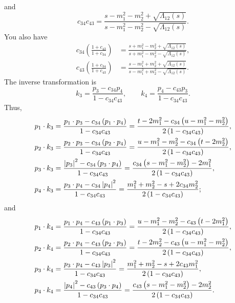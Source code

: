 and
\begin{equation}
	c_{34}c_{43} = \frac{s - m_{1}^{2} - m_{2}^{2} + \sqrt{\Lambda_{12}(s)}}{s - m_{1}^{2} - m_{2}^{2} - \sqrt{\Lambda_{12}(s)}}.
\end{equation}
You also have
\begin{align}
	c_{34} \left( \frac{1 + c_{43}}{1 + c_{34}} \right) &= \frac{s + m_{1}^{2} - m_{2}^{2} + \sqrt{\Lambda_{12}(s)}}{s + m_{1}^{2} - m_{2}^{2} - \sqrt{\Lambda_{12}(s)}}, \\
	c_{43} \left( \frac{1 + c_{34}}{1 + c_{43}} \right) &= \frac{s - m_{1}^{2} + m_{2}^{2} + \sqrt{\Lambda_{12}(s)}}{s - m_{1}^{2} + m_{2}^{2} - \sqrt{\Lambda_{12}(s)}}.
\end{align}
The inverse transformation is
\begin{equation}
	k_{3} = \frac{p_{3} - c_{34} p_{4}}{1 - c_{34} c_{43}}, \qquad k_{4} = \frac{p_{4} - c_{43} p_{3}}{1 - c_{34} c_{43}}.
\end{equation}
Thus,
\begin{align}
	p_{1} \cdot k_{3} &= \frac{p_{1} \cdot p_{3} - c_{34} \left( p_{1} \cdot p_{4} \right)}{1 - c_{34} c_{43}} = \frac{ t - 2m_{1}^{2} - c_{34} \left( u - m_{1}^{2} - m_{2}^{2} \right) }{2 \left(1 - c_{34} c_{43} \right)}, \\
	p_{2} \cdot k_{3} &= \frac{p_{2} \cdot p_{3} - c_{34} \left( p_{2} \cdot p_{4} \right)}{1 - c_{34} c_{43}} = \frac{ u - m_{1}^{2} - m_{2}^{2} - c_{34} \left( t - 2m_{2}^{2} \right) }{2 \left(1 - c_{34} c_{43} \right)}, \\
	p_{3} \cdot k_{3} &= \frac{\left\lvert p_{3} \right\rvert^{2} - c_{34} \left( p_{3} \cdot p_{4} \right)}{1 - c_{34} c_{43}} = \frac{ c_{34} \left( s - m_{1}^{2} - m_{2}^{2} \right) - 2m_{1}^{2} }{2 \left(1 - c_{34} c_{43} \right)}, \\
	p_{4} \cdot k_{3} &= \frac{p_{3} \cdot p_{4} - c_{34} \left\lvert p_{4} \right\rvert^{2}}{1 - c_{34} c_{43}} = \frac{ m_{1}^{2} + m_{2}^{2} - s + 2 c_{34} m_{2}^{2} }{2 \left(1 - c_{34} c_{43} \right)};
\end{align}
and
\begin{align}
	p_{1} \cdot k_{4} &= \frac{p_{1} \cdot p_{4} - c_{43} \left( p_{1} \cdot p_{3} \right)}{1 - c_{34} c_{43}} = \frac{u - m_{1}^{2} - m_{2}^{2} - c_{43} \left(t - 2 m_{1}^{2} \right)}{2 \left( 1 - c_{34} c_{43} \right)}, \\
	p_{2} \cdot k_{4} &= \frac{p_{2} \cdot p_{4} - c_{43} \left( p_{2} \cdot p_{3} \right)}{1 - c_{34} c_{43}} = \frac{t - 2m_{2}^{2} - c_{43} \left( u - m_{1}^{2} - m_{2}^{2} \right)}{2 \left( 1 - c_{34} c_{43} \right)}, \\
	p_{3} \cdot k_{4} &= \frac{p_{3} \cdot p_{4} - c_{43} \left\lvert p_{3} \right\rvert^{2}}{1 - c_{34} c_{43}} = \frac{m_{1}^{2} + m_{2}^{2} - s + 2 c_{43} m_{1}^{2}}{2 \left( 1 - c_{34} c_{43} \right)}, \\
	p_{4} \cdot k_{4} &= \frac{ \left\lvert p_{4} \right\rvert^{2} - c_{43} \left( p_{3} \cdot p_{4} \right)}{1 - c_{34} c_{43}} = \frac{c_{43} \left( s - m_{1}^{2} - m_{2}^{2} \right) - 2 m_{2}^{2}}{2 \left( 1 - c_{34} c_{43} \right)}.
\end{align}
